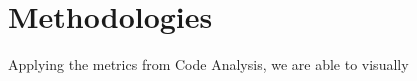 \section{Methodologies}

Applying the metrics from \cite{article:mozilla} Code Analysis, we are able to visually
